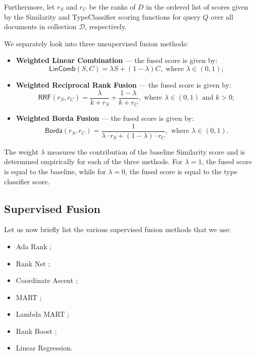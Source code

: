 Furthermore, let $r_S$ and $r_C$ be the ranks of $D$ in the ordered list of scores given by the
\textsf{Similarity} and \textsf{TypeClassifier} scoring functions for query $Q$ over all documents in collection $\mathcal{D}$,
respectively.

We separately look into three unsupervised fusion methods:
\begin{itemize}

 \item \textbf{Weighted Linear Combination} --- the fused score is given by: 
 \begin{equation} \label{interp-formula}
 \textsf{LinComb}(S, C) = \lambda S + (1-\lambda) C, \text{ where } \lambda \in (0,1);
 \end{equation}

\item \textbf{Weighted Reciprocal Rank Fusion} \cite{rrf} --- the fused score is given by:
 \begin{equation}\label{rrf-formula}
  \textsf{RRF}(r_S, r_C) =  \displaystyle\frac{\lambda}{k + r_S} + \displaystyle\frac{1- \lambda}{k + r_C},  \text{ where } \lambda \in (0,1)
  \text{ and } k>0;
 \end{equation}
 
 \item \textbf{Weighted Borda Fusion} \cite{borda} ---  the fused score is given by:
 \begin{equation}\label{borda-formula}
   \textsf{Borda}(r_S, r_C) =  \displaystyle\frac{1}{\lambda \cdot r_S + (1-\lambda)\cdot r_C},  \text{ where } \lambda \in (0,1).
 \end{equation}
  \end{itemize}

The weight $\lambda$ measures the contribution of the baseline \textsf{Similarity} score and
is determined empirically for each of the three methods. For $\lambda=1$, the fused score is equal to the baseline,
while for $\lambda=0$, the fused score is equal to the type classifier score.

\subsection{Supervised Fusion}\label{sup-fusion}
Let us now briefly list the various supervised fusion methods that we use:
\begin{itemize}
 \item {Ada Rank} \cite{adaRank};
 \item {Rank Net} \cite{rankNet};
 \item {Coordinate Ascent} \cite{coordAscent};
 \item {MART} \cite{mart};
 \item {Lambda MART} \cite{lambda-mart};
 \item {Rank Boost} \cite{rankBoost};
  \item {Linear Regression}.
\end{itemize}


